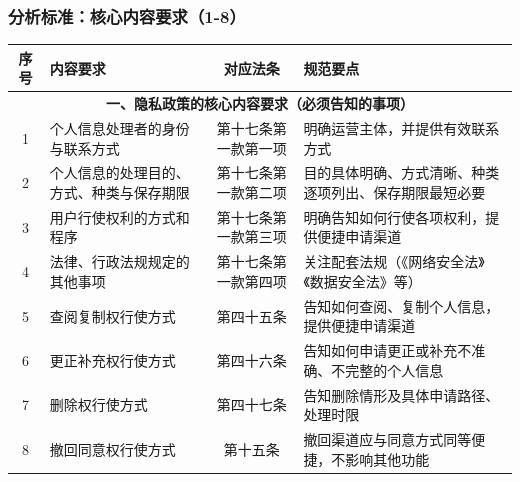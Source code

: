 \documentclass[AutoFakeBold,AutoFakeSlant]{beamer}
\begin{document}
\begin{frame}
	\frametitle{分析标准：核心内容要求（1-8）}
	\tiny
	\begin{tabularx}{\textwidth}{|c|X|c|X|}
		\toprule
		\textbf{序号} & \textbf{内容要求} & \textbf{对应法条} & \textbf{规范要点} \\
		\midrule
		\multicolumn{4}{|c|}{\textbf{一、隐私政策的核心内容要求（必须告知的事项）}} \\
		\midrule
		1 & 个人信息处理者的身份与联系方式 & 第十七条第一款第一项 & 明确运营主体，并提供有效联系方式 \\
		\midrule
		2 & 个人信息的处理目的、方式、种类与保存期限 & 第十七条第一款第二项 & 目的具体明确、方式清晰、种类逐项列出、保存期限最短必要 \\
		\midrule
		3 & 用户行使权利的方式和程序 & 第十七条第一款第三项 & 明确告知如何行使各项权利，提供便捷申请渠道 \\
		\midrule
		4 & 法律、行政法规规定的其他事项 & 第十七条第一款第四项 & 关注配套法规（《网络安全法》《数据安全法》等） \\
		\midrule
		5 & 查阅复制权行使方式 & 第四十五条 & 告知如何查阅、复制个人信息，提供便捷申请渠道 \\
		\midrule
		6 & 更正补充权行使方式 & 第四十六条 & 告知如何申请更正或补充不准确、不完整的个人信息 \\
		\midrule
		7 & 删除权行使方式 & 第四十七条 & 告知删除情形及具体申请路径、处理时限 \\
		\midrule
		8 & 撤回同意权行使方式 & 第十五条 & 撤回渠道应与同意方式同等便捷，不影响其他功能 \\
		\bottomrule
	\end{tabularx}
\end{frame}
\end{document}
